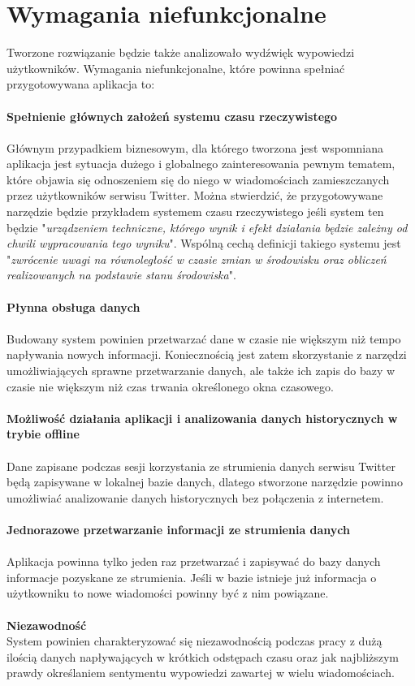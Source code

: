 \section{Wymagania niefunkcjonalne}
Tworzone rozwiązanie będzie także analizowało wydźwięk wypowiedzi użytkowników. Wymagania niefunkcjonalne, które powinna spełniać przygotowywana aplikacja to: \\
\\
\textbf{Spełnienie głównych założeń systemu czasu rzeczywistego} \\
\\
Głównym przypadkiem biznesowym, dla którego tworzona jest wspomniana aplikacja jest sytuacja dużego i globalnego zainteresowania pewnym tematem, które objawia się odnoszeniem się do niego w wiadomościach zamieszczanych przez użytkowników serwisu Twitter. Można stwierdzić, że przygotowywane narzędzie będzie przykładem systemem czasu rzeczywistego jeśli system ten będzie "\textit{urządzeniem techniczne, którego wynik i efekt działania będzie zależny od chwili wypracowania tego wyniku}". Wspólną cechą definicji takiego systemu jest "\textit{zwrócenie uwagi na równoległość w czasie zmian w środowisku oraz obliczeń realizowanych na podstawie stanu środowiska}". \\
\\
\textbf{Płynna obsługa danych} \\
\\
Budowany system powinien przetwarzać dane w czasie nie większym niż tempo napływania nowych informacji. Koniecznością jest zatem skorzystanie z narzędzi umożliwiających sprawne przetwarzanie danych, ale także ich zapis do bazy w czasie nie większym niż czas trwania określonego okna czasowego. \\
\\
\textbf{Możliwość działania aplikacji i analizowania danych historycznych w trybie offline} \\
\\
Dane zapisane podczas sesji korzystania ze strumienia danych serwisu Twitter będą zapisywane w lokalnej bazie danych, dlatego stworzone narzędzie powinno umożliwiać analizowanie danych historycznych bez połączenia z internetem. \\
\\
\textbf{Jednorazowe przetwarzanie informacji ze strumienia danych} \\ 
\\
Aplikacja powinna tylko jeden raz przetwarzać i zapisywać do bazy danych informacje pozyskane ze strumienia. Jeśli w bazie istnieje już informacja o użytkowniku to nowe wiadomości powinny być z nim powiązane. \\ 
\\ 
\textbf{Niezawodność} \\
System powinien charakteryzować się niezawodnością podczas pracy z dużą ilością danych napływających w krótkich odstępach czasu oraz jak najbliższym prawdy określaniem sentymentu wypowiedzi zawartej w wielu wiadomościach.

